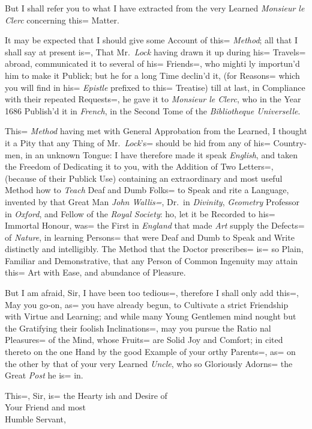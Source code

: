 But I shall refer you to what I have extracted from the very Learned \emph{Monsieur le Clerc} concerning this= Matter.

It may be expected that I should give some Account of this= \emph{Method};
all that I shall say at present is=, That Mr.\ \emph{Lock} having drawn it up during his= Travels= abroad, communicated it to several of his= Friends=, who mighti ly importun'd him to make it Publick;
but he for a long Time declin'd it, (for Reasons= which you will find in his= \emph{Epistle} prefixed to this= Treatise) till at last, in Compliance with their repeated Requests=, he gave it to \emph{Monsieur le Clerc}, who in the Year 1686 Publish'd it in \emph{French}, in the Second Tome of the \emph{Bibliotheque Universelle}.

This= \emph{Method} having met with General Approbation from the Learned, I thought it a Pity that any Thing of Mr.\ \emph{Lock}'s= should be hid from any of his= Country-men, in an unknown Tongue:
I have therefore made it speak \emph{English}, and taken the Freedom of Dedicating it to you, with the Addition of Two Letters=, (because of their Publick Use) containing an extraordinary and most useful Method how to \emph{Teach} Deaf and Dumb Folks= to Speak and \VV rite a Language, invented by that Great Man \emph{John Wallis=}, Dr.\ in \emph{Divinity}, \emph{Geometry} Professor in \emph{Oxford}, and Fellow of the \emph{Royal Society}:
\VV ho, let it be Recorded to his= Immortal Honour, was= the First in \emph{England} that made \emph{Art} supply the Defects= of \emph{Nature}, in learning Persons= that were Deaf and Dumb to Speak and Write distinctly and intelligibly.
The Method that the Doctor prescribes= is= so Plain, Familiar and Demonstrative, that any Person of Common Ingenuity may attain this= Art with Ease, and abundance of Pleasure.

But I am afraid, Sir, I have been too tedious=, therefore I shall only add this=, May you go-on, as= you have already begun, to Cultivate a strict Friendship with Virtue and Learning;
and while many Young Gentlemen mind nought but the Gratifying their foolish Inclinations=, may you pursue the Ratio nal Pleasures= of the Mind, whose Fruits= are Solid Joy and Comfort;
in cited thereto on the one Hand by the good Example of your \VV orthy Parents=, as= on the other by that of your very Learned \emph{Uncle}, who so Gloriously Adorns= the Great \emph{Post} he is= in.

This=, Sir, is= the Hearty \VV ish and Desire of\\[\baselineskip]

{\Large\hfill Your Friend and most\hspace*{4ex}}\\[\baselineskip]

{\Large\hfill Humble Servant,\hspace*{4ex}}
\clearpage
\fancyhead[C]{}
